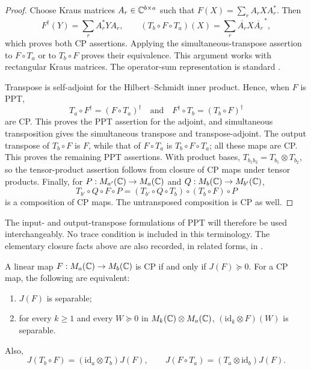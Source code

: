 \begin{proof}
Choose Kraus matrices $A_r\in\mathbb C^{b\times a}$ such that
$F(X)=\sum_r A_rXA_r^*$.  Then
\[
 F^\dagger(Y)=\sum_r A_r^*YA_r,
 \qquad
 (T_b\circ F\circ T_a)(X)
       =\sum_r\overline{A_r}X\overline{A_r}^{\,*},
\]
which proves both CP assertions.  Applying the simultaneous-transpose
assertion to $F\circ T_a$ or to $T_b\circ F$ proves their equivalence.
This argument works with rectangular Kraus matrices.
The operator-sum representation is standard \cite{Kraus1971,Choi1975}.

Transpose is self-adjoint for the Hilbert--Schmidt inner product.  Hence,
when $F$ is PPT,
\[
 T_a\circ F^\dagger=(F\circ T_a)^\dagger
 \quad\text{and}\quad
 F^\dagger\circ T_b=(T_b\circ F)^\dagger
\]
are CP.  This proves the PPT assertion for the adjoint, and simultaneous
transposition gives the simultaneous transpose and transpose-adjoint.
The output transpose of $T_b\circ F$ is $F$, while that of
$F\circ T_a$ is $T_b\circ F\circ T_a$; all these maps are CP.  This proves
the remaining PPT assertions.  With product bases,
$T_{b_1b_2}=T_{b_1}\otimes T_{b_2}$, so the tensor-product assertion follows
from closure of CP maps under tensor products.  Finally, for
$P:M_{a'}(\mathbb C)\to M_{a}(\mathbb C)$ and $Q:M_{b}(\mathbb C)\to M_{b'}(\mathbb C)$,
\[
 T_{b'}\circ Q\circ F\circ P
 = (T_{b'}\circ Q\circ T_b)\circ(T_b\circ F)\circ P
\]
is a composition of CP maps.  The untransposed composition is CP as well.
\end{proof}

The input- and output-transpose formulations of PPT will therefore be used
interchangeably.  No trace condition is included in this terminology.
The elementary closure facts above are also recorded, in related forms, in
\cite[Lemma 2.1]{KMP2018}.

\begin{lemma}\label{lem:choi-separable}
A linear map $F:M_{a}(\mathbb C)\to M_{b}(\mathbb C)$ is CP if and only if $J(F)\succeq0$.
For a CP map, the following are equivalent:
\begin{enumerate}
 \item $J(F)$ is separable;
 \item for every $k\geq1$ and every $W\succeq0$ in $M_{k}(\mathbb C)\otimes M_{a}(\mathbb C)$,
       $(\mathrm{id}_k\otimes F)(W)$ is separable.
\end{enumerate}
Also,
\[
 J(T_b\circ F)=(\mathrm{id}_a\otimes T_b)J(F),\qquad
 J(F\circ T_a)=(T_a\otimes\mathrm{id}_b)J(F).
\]
\end{lemma}

